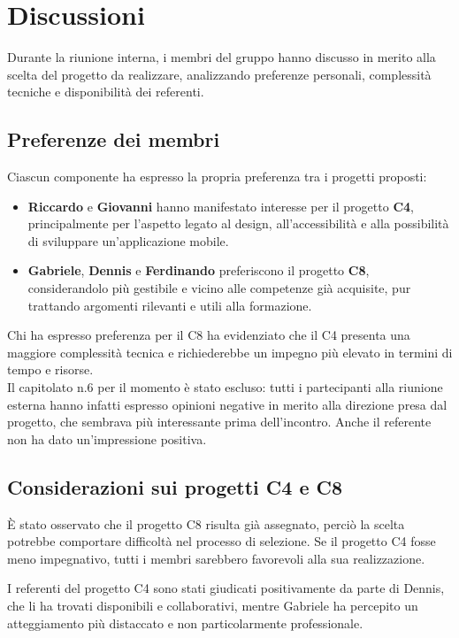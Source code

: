 \documentclass[a4paper,12pt]{article}
\begin{document}
\section{Discussioni}
Durante la riunione interna, i membri del gruppo hanno discusso in merito alla scelta del progetto da realizzare, analizzando preferenze personali, complessità tecniche e disponibilità dei referenti.

\subsection{Preferenze dei membri}
Ciascun componente ha espresso la propria preferenza tra i progetti proposti:
\begin{itemize}
    \item \textbf{Riccardo} e \textbf{Giovanni} hanno manifestato interesse per il progetto \textbf{C4}, principalmente per l’aspetto legato al design, all’accessibilità e alla possibilità di sviluppare un’applicazione mobile.
    \item \textbf{Gabriele}, \textbf{Dennis} e \textbf{Ferdinando} preferiscono il progetto \textbf{C8}, considerandolo più gestibile e vicino alle competenze già acquisite, pur trattando argomenti rilevanti e utili alla formazione.
\end{itemize}
Chi ha espresso preferenza per il C8 ha evidenziato che il C4 presenta una maggiore complessità tecnica e richiederebbe un impegno più elevato in termini di tempo e risorse.  
\\
Il capitolato n.6 per il momento è stato escluso: tutti i partecipanti alla riunione esterna hanno infatti espresso opinioni negative in merito alla direzione presa dal progetto, che sembrava più interessante prima dell'incontro. Anche il referente non ha dato un'impressione positiva.

\subsection{Considerazioni sui progetti C4 e C8}
È stato osservato che il progetto C8 risulta già assegnato, perciò la scelta potrebbe comportare difficoltà nel processo di selezione.  
Se il progetto C4 fosse meno impegnativo, tutti i membri sarebbero favorevoli alla sua realizzazione.  

I referenti del progetto C4 sono stati giudicati positivamente da parte di Dennis, che li ha trovati disponibili e collaborativi, mentre Gabriele ha percepito un atteggiamento più distaccato e non particolarmente professionale.
\end{document}
